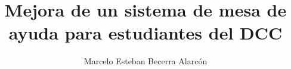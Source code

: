 \documentclass{umemoria}
\author{Marcelo Esteban Becerra Alarcón}
\title{Mejora de un sistema de mesa de ayuda para estudiantes del DCC}
\begin{document}
\frontmatter
\maketitle



% 
% 
\tableofcontents
\listoffigures %

\mainmatter










\nocite{*}
% 
% 
\printbibliography

\newpage

\printglossaries
\end{document}
